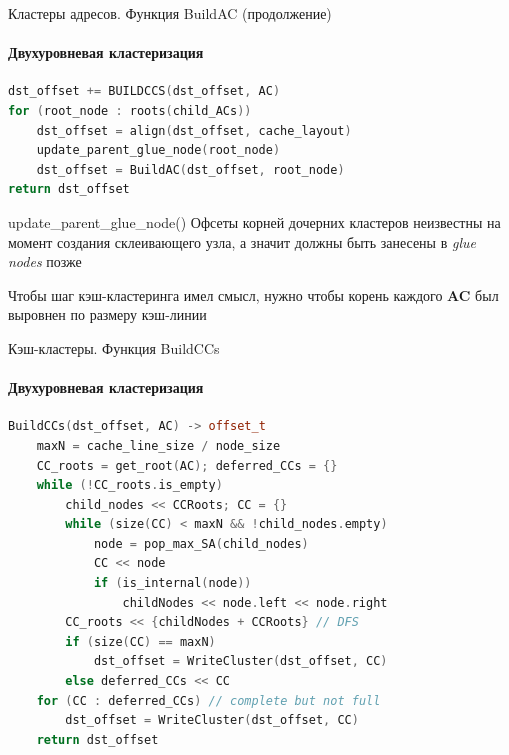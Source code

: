 \documentclass{beamer}
\begin{document}
\begin{frame}[fragile]{Кластеры адресов. Функция BuildAC (продолжение)}
    \framesubtitle{Двухуровневая кластеризация}
    \begin{lstlisting}[language=C++,basicstyle=\ttfamily,keywordstyle=\color{blue}]
dst_offset += BUILDCCS(dst_offset, AC)
for (root_node : roots(child_ACs))
    dst_offset = align(dst_offset, cache_layout)
    update_parent_glue_node(root_node)
    dst_offset = BuildAC(dst_offset, root_node)
return dst_offset
    \end{lstlisting}
    \begin{block}{update\_parent\_glue\_node()}
        Офсеты корней дочерних кластеров неизвестны на момент создания склеивающего узла,
        а значит должны быть занесены в \textit{glue nodes} позже
    \end{block}
    \begin{block}{}
        Чтобы шаг кэш-кластеринга имел смысл, нужно чтобы корень каждого \textbf{AC} был
        выровнен по размеру кэш-линии
    \end{block}
\end{frame}

\begin{frame}[fragile]{Кэш-кластеры. Функция BuildCCs}
    \framesubtitle{Двухуровневая кластеризация}
    \begin{adjustbox}{width=\textwidth, keepaspectratio}
        \begin{lstlisting}[language=C++,basicstyle=\ttfamily,keywordstyle=\color{blue}]
BuildCCs(dst_offset, AC) -> offset_t
    maxN = cache_line_size / node_size
    CC_roots = get_root(AC); deferred_CCs = {}
    while (!CC_roots.is_empty)
        child_nodes << CCRoots; CC = {}
        while (size(CC) < maxN && !child_nodes.empty)
            node = pop_max_SA(child_nodes)
            CC << node
            if (is_internal(node))
                childNodes << node.left << node.right
        CC_roots << {childNodes + CCRoots} // DFS
        if (size(CC) == maxN)
            dst_offset = WriteCluster(dst_offset, CC)
        else deferred_CCs << CC
    for (CC : deferred_CCs) // complete but not full
        dst_offset = WriteCluster(dst_offset, CC)
    return dst_offset
    \end{lstlisting}
\end{adjustbox}
\end{frame}
\end{document}
